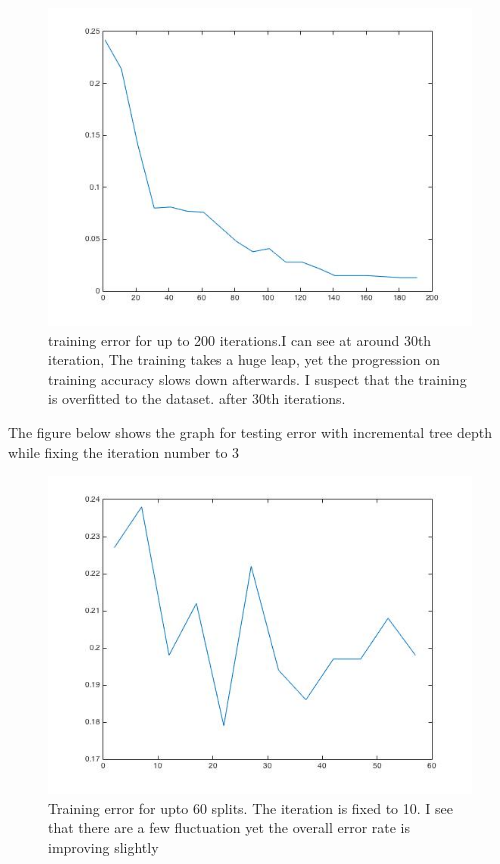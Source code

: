 \documentclass[twoside]{article}
\theoremstyle{definition}
\theoremstyle{definition}
\theoremstyle{remark}
\begin{document}
\begin{figure}[H]
\centering
\includegraphics[width=120mm]{problem1_2.jpg}
\caption{training error for up to 200 iterations.I can see at around 30th iteration, The training takes a huge leap, yet the progression on training accuracy slows down afterwards. I suspect that the training is overfitted to the dataset. after 30th iterations.}
\end{figure}

The figure below shows the graph for testing error with incremental tree depth while fixing the iteration number to $3$
\begin{figure}[H]
\centering
\includegraphics[width=120mm]{problem1_3.jpg}
\caption{Training error for upto $60$ splits. The iteration is fixed to 10. I see that there are a few fluctuation yet the overall error rate is improving slightly }
\end{figure}
\end{document}
